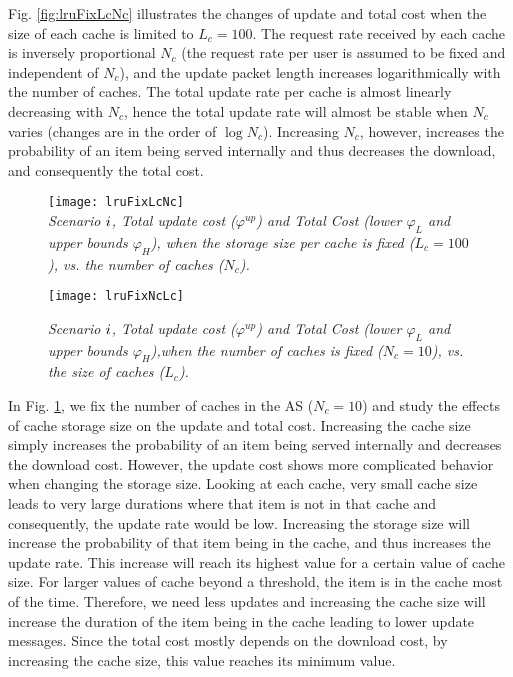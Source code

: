 \documentclass[conference]{IEEEtran}
\theoremstyle{plain}
\theoremstyle{remark}
\begin{document}
Fig. \ref{fig:lruFixLcNc} illustrates the changes of update and total cost when the size of each cache is limited to $L_c=100$. The request rate received by each cache is inversely proportional $N_c$ (the request rate per user is assumed to be fixed and independent of $N_c$), and the update packet length increases logarithmically with the number of caches. The total update rate per cache is almost linearly decreasing with $N_c$, hence the total update rate will almost be stable when $N_c$ varies (changes are in the order of $\log N_c$). Increasing $N_c$, however, increases the probability of an item being served internally and thus decreases the download, and consequently the total cost.
\begin{figure}[http]
    \center
      \texttt{[image: lruFixLcNc]}\\
      \caption{\textit{Scenario $\romannumeral 1$, Total update cost ($\varphi^{up}$) and Total Cost (lower $\varphi_L$ and upper bounds $\varphi_H$), when the storage size per cache is fixed ($L_c=100$), vs. the number of caches ($N_c$).}}
        \label{fig:lruFixLcNc}
\texttt{[image: lruFixNcLc]}\\
      \caption{\textit{Scenario $\romannumeral 1$, Total update cost ($\varphi^{up}$) and Total Cost (lower $\varphi_L$ and upper bounds $\varphi_H$),when the number of caches is fixed ($N_c=10$), vs. the size of caches ($L_c$).}}
    \label{fig:lruFixNcLc}
\end{figure}

In Fig. \ref{fig:lruFixNcLc}, we fix the number of caches in the AS ($N_c=10$) and study the effects of cache storage size on the update and total cost. Increasing the cache size simply increases the probability of an item being served internally and decreases the download cost. However, the update cost shows more complicated behavior when changing the storage size. Looking at each cache, very small cache size leads to very large durations where that item is not in that cache and consequently, the update rate would be low. Increasing the storage size will increase the probability of that item being in the cache, and thus increases the update rate. This increase will reach its highest value for a certain value of cache size.
For larger values of cache beyond a threshold, the item is in the cache most of the time. Therefore, we need less updates and increasing the cache size will increase the duration of the item being in the cache leading to lower update messages. Since the total cost mostly depends on the download cost, by increasing the cache size, this value reaches its minimum value.
\end{document}
